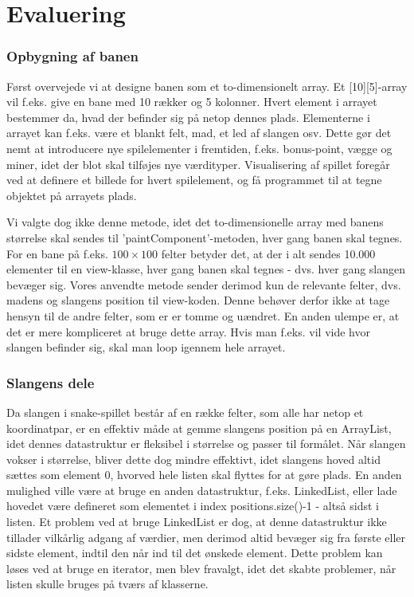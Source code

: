 \section{Evaluering}

\subsubsection{Opbygning af banen}
Først overvejede vi at designe banen som et to-dimensionelt array. Et [10][5]-array vil f.eks. give en bane med 10 rækker og 5 kolonner. Hvert element i arrayet bestemmer da, hvad der befinder sig på netop dennes plads. Elementerne i arrayet kan f.eks. være et blankt felt, mad, et led af slangen osv. Dette gør det nemt at introducere nye spilelementer i fremtiden, f.eks. bonus-point, vægge og miner, idet der blot skal tilføjes nye værdityper. Visualisering af spillet foregår ved at definere et billede for hvert spilelement, og få programmet til at tegne objektet på arrayets plads.

Vi valgte dog ikke denne metode, idet det to-dimensionelle array med banens størrelse skal sendes til 'paintComponent'-metoden, hver gang banen skal tegnes. For en bane på f.eks. $100\times 100$ felter betyder det, at der i alt sendes 10.000 elementer til en view-klasse, hver gang banen skal tegnes - dvs. hver gang slangen bevæger sig. Vores anvendte metode sender derimod kun de relevante felter, dvs. madens og slangens position til view-koden. Denne behøver derfor ikke at tage hensyn til de andre felter, som er er tomme og uændret. En anden ulempe er, at det er mere kompliceret at bruge dette array. Hvis man f.eks. vil vide hvor slangen befinder sig, skal man loop igennem hele arrayet.

\subsubsection{Slangens dele}
Da slangen i snake-spillet består af en række felter, som alle har netop et koordinatpar, er en effektiv måde at gemme slangens position på en ArrayList, idet dennes datastruktur er fleksibel i størrelse og passer til formålet. Når slangen vokser i størrelse, bliver dette dog mindre effektivt, idet slangens hoved altid sættes som element 0, hvorved hele listen skal flyttes for at gøre plads. En anden mulighed ville være at bruge en anden datastruktur, f.eks. LinkedList, eller lade hovedet være defineret som elementet i index positions.size()-1 - altså sidst i listen. Et problem ved at bruge LinkedList er dog, at denne datastruktur ikke tillader vilkårlig adgang af værdier, men derimod altid bevæger sig fra første eller sidste element, indtil den når ind til det ønskede element. Dette problem kan løses ved at bruge en iterator, men blev fravalgt, idet det skabte problemer, når listen skulle bruges på tværs af klasserne.

